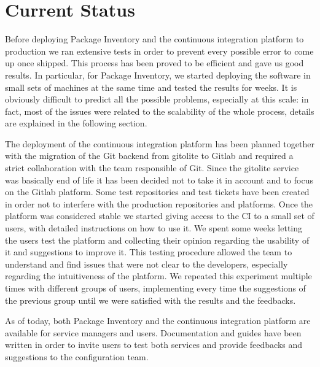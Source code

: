 \section{Current Status}

Before deploying Package Inventory and the continuous integration platform
to production we ran extensive tests in order to prevent every possible
error to come up once shipped. This process has been proved to be
efficient and gave us good results. In particular, for Package Inventory,
we started deploying the software in small sets of machines at the same
time and tested the results for weeks. It is obviously difficult to
predict all the possible problems, especially at this scale: in fact, most
of the issues were related to the scalability of the whole process,
details are explained in the following section.

The deployment of the continuous integration platform has been planned
together with the migration of the Git backend from gitolite to Gitlab and
required a strict collaboration with the team responsible of Git. Since
the gitolite service was basically end of life it has been decided not to
take it in account and to focus on the Gitlab platform. Some test
repositories and test tickets have been created in order not to interfere
with the production repositories and platforms. Once the platform was
considered stable we started giving access to the CI to a small set of
users, with detailed instructions on how to use it. We spent some weeks
letting the users test the platform and collecting their opinion regarding
the usability of it and suggestions to improve it. This testing procedure
allowed the team to understand and find issues that were not clear to the
developers, especially regarding the intuitiveness of the platform. We
repeated this experiment multiple times with different groups of users,
implementing every time the suggestions of the previous group until we
were satisfied with the results and the feedbacks.

As of today, both Package Inventory and the continuous integration
platform are available for service managers and users. Documentation and
guides have been written in order to invite users to test both services
and provide feedbacks and suggestions to the configuration team.
